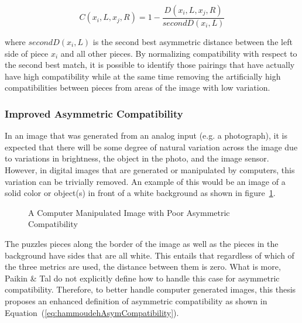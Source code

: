 \documentclass{report}
\def\eref#1{(\ref{#1})}
\begin{document}
\begin{equation} \label{eq:paikinAsymCompatibility}
C(x_i,L,x_j,R)=1 - \frac{D(x_i,L,x_j,R)}{secondD(x_i,L)}
\end{equation}

\noindent
where $secondD(x_i,L)$ is the second best asymmetric distance between the left side of piece $x_i$ and all other pieces.  By normalizing compatibility with respect to the second best match, it is possible to identify those pairings that have actually have high compatibility while at the same time removing the artificially high compatibilities between pieces from areas of the image with low variation.

\subsubsection{Improved Asymmetric Compatibility}\label{sec:hammoudehPairwiseAffinity}

In an image that was generated from an analog input (e.g. a photograph), it is expected that there will be some degree of natural variation across the image due to variations in brightness, the object in the photo, and the image sensor.  However, in digital images that are generated or manipulated by computers, this variation can be trivially removed.  An example of this would be an image of a solid color or object(s) in front of a white background as shown in figure~\ref{fig:objectWhiteBackground}.

\begin{figure}
\centering
{}
\caption{A Computer Manipulated Image with Poor Asymmetric Compatibility}
\label{fig:objectWhiteBackground}
\end{figure}

The puzzles pieces along the border of the image as well as the pieces in the background have sides that are all white.  This entails that regardless of which of the three metrics are used, the distance between them is zero.  What is more, Paikin \& Tal do not explicitly define how to handle this case for asymmetric compatibility.  Therefore, to better handle computer generated images, this thesis proposes an enhanced definition of asymmetric compatibility as shown in Equation~\eref{eq:hammoudehAsymCompatibility}.  
\end{document}
